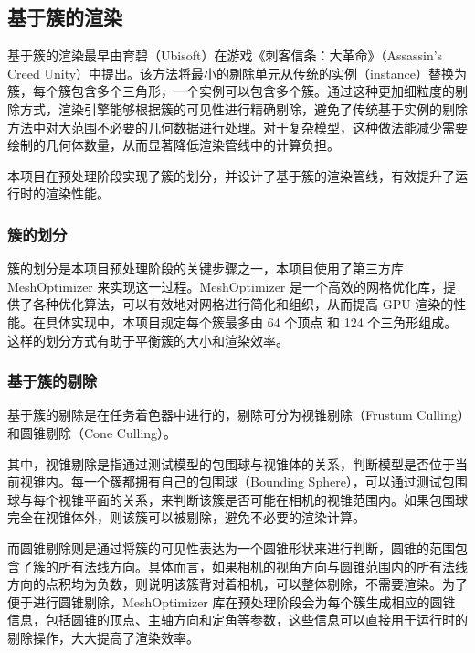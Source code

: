 \subsection{基于簇的渲染}

基于簇的渲染最早由育碧（Ubisoft）在游戏《刺客信条：大革命》（Assassin's Creed Unity）中提出\cite{Ubisoft2015}。该方法将最小的剔除单元从传统的实例（instance）替换为簇，每个簇包含多个三角形，一个实例可以包含多个簇。通过这种更加细粒度的剔除方式，渲染引擎能够根据簇的可见性进行精确剔除，避免了传统基于实例的剔除方法中对大范围不必要的几何数据进行处理。对于复杂模型，这种做法能减少需要绘制的几何体数量，从而显著降低渲染管线中的计算负担。

本项目在预处理阶段实现了簇的划分，并设计了基于簇的渲染管线，有效提升了运行时的渲染性能。

\subsubsection{簇的划分} \label{subsubsec:cluster division}

簇的划分是本项目预处理阶段的关键步骤之一，本项目使用了第三方库 MeshOptimizer 来实现这一过程\cite{meshoptimizer}。MeshOptimizer 是一个高效的网格优化库，提供了各种优化算法，可以有效地对网格进行简化和组织，从而提高 GPU 渲染的性能。在具体实现中，本项目规定每个簇最多由 64 个顶点 和 124 个三角形组成。这样的划分方式有助于平衡簇的大小和渲染效率\cite{Kubisch2018}。

\subsubsection{基于簇的剔除} \label{subsubsec:cluster culling}

基于簇的剔除是在任务着色器中进行的，剔除可分为视锥剔除（Frustum Culling）和圆锥剔除（Cone Culling）。

其中，视锥剔除是指通过测试模型的包围球与视锥体的关系，判断模型是否位于当前视锥内。每一个簇都拥有自己的包围球（Bounding Sphere），可以通过测试包围球与每个视锥平面的关系，来判断该簇是否可能在相机的视锥范围内。如果包围球完全在视锥体外，则该簇可以被剔除，避免不必要的渲染计算。

而圆锥剔除则是通过将簇的可见性表达为一个圆锥形状来进行判断，圆锥的范围包含了簇的所有法线方向。具体而言，如果相机的视角方向与圆锥范围内的所有法线方向的点积均为负数，则说明该簇背对着相机，可以整体剔除，不需要渲染。为了便于进行圆锥剔除，MeshOptimizer 库在预处理阶段会为每个簇生成相应的圆锥信息，包括圆锥的顶点、主轴方向和定角等参数，这些信息可以直接用于运行时的剔除操作，大大提高了渲染效率。

